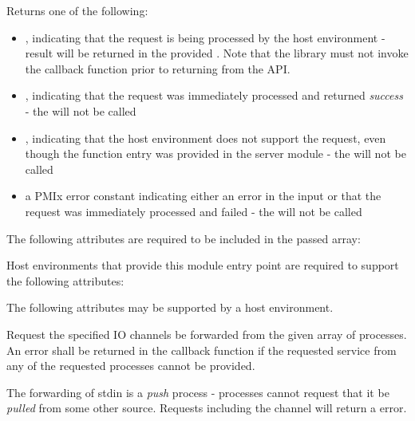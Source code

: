 Returns one of the following:

\begin{itemize}
    \item {}, indicating that the request is being processed by the host environment - result will be returned in the provided . Note that the library must not invoke the callback function prior to returning from the \ac{API}.
    \item {}, indicating that the request was immediately processed and returned \textit{success} - the  will not be called
    \item {}, indicating that the host environment does not support the request, even though the function entry was provided in the server module - the  will not be called
    \item a PMIx error constant indicating either an error in the input or that the request was immediately processed and failed - the  will not be called
\end{itemize}


\reqattrstart
The following attributes are required to be included in the passed  array:


\divider

Host environments that provide this module entry point are required to support the following attributes:


\reqattrend

\optattrstart
The following attributes may be supported by a host environment.


\optattrend

\descr

Request the specified IO channels be forwarded from the given array of processes. An error shall be returned in the callback function if the requested service from any of the requested processes cannot be provided.

\adviceimplstart
The forwarding of stdin is a \textit{push} process - processes cannot request that it be \textit{pulled} from some other source. Requests including the  channel will return a  error.
\adviceimplend

